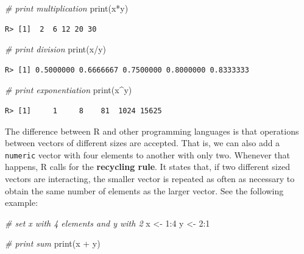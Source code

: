 \documentclass[
  12pt,
]{book}
\newenvironment{Shaded}{\begin{snugshade}}{\end{snugshade}}
\newcommand{\CommentTok}[1]{\textcolor[rgb]{0.37,0.37,0.37}{\textit{#1}}}
\newcommand{\DecValTok}[1]{\textcolor[rgb]{0.06,0.06,0.06}{#1}}
\newcommand{\FunctionTok}[1]{\textcolor[rgb]{0,0,0}{#1}}
\newcommand{\NormalTok}[1]{#1}
\newcommand{\OtherTok}[1]{\textcolor[rgb]{0.37,0.37,0.37}{#1}}
\newcommand{\SpecialCharTok}[1]{\textcolor[rgb]{0,0,0}{#1}}
\begin{document}
\begin{Shaded}
\begin{Highlighting}[]
\CommentTok{\# print multiplication}
\FunctionTok{print}\NormalTok{(x}\SpecialCharTok{*}\NormalTok{y)}
\end{Highlighting}
\end{Shaded}

\begin{verbatim}
R> [1]  2  6 12 20 30
\end{verbatim}

\begin{Shaded}
\begin{Highlighting}[]
\CommentTok{\# print division}
\FunctionTok{print}\NormalTok{(x}\SpecialCharTok{/}\NormalTok{y)}
\end{Highlighting}
\end{Shaded}

\begin{verbatim}
R> [1] 0.5000000 0.6666667 0.7500000 0.8000000 0.8333333
\end{verbatim}

\begin{Shaded}
\begin{Highlighting}[]
\CommentTok{\# print exponentiation}
\FunctionTok{print}\NormalTok{(x}\SpecialCharTok{\^{}}\NormalTok{y)}
\end{Highlighting}
\end{Shaded}

\begin{verbatim}
R> [1]     1     8    81  1024 15625
\end{verbatim}

The difference between R and other programming languages is that operations between vectors of different sizes are accepted. That is, we can also add a \texttt{numeric} vector with four elements to another with only two. Whenever that happens, R calls for the \textbf{recycling rule}. It states that, if two different sized vectors are interacting, the smaller vector is repeated as often as necessary to obtain the same number of elements as the larger vector. See the following example: 

\begin{Shaded}
\begin{Highlighting}[]
\CommentTok{\# set x with 4 elements and y with 2}
\NormalTok{x }\OtherTok{\textless{}{-}} \DecValTok{1}\SpecialCharTok{:}\DecValTok{4}
\NormalTok{y }\OtherTok{\textless{}{-}} \DecValTok{2}\SpecialCharTok{:}\DecValTok{1}

\CommentTok{\# print sum}
\FunctionTok{print}\NormalTok{(x }\SpecialCharTok{+}\NormalTok{ y)}
\end{Highlighting}
\end{Shaded}
\end{document}

